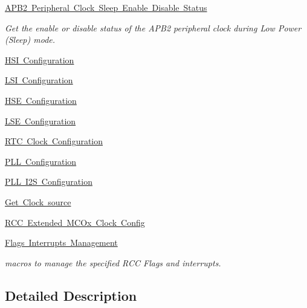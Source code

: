 \begin{DoxyCompactItemize}
\mbox{\hyperlink{group___r_c_c___a_p_b2___clock___sleep___enable___disable___status}{A\+P\+B2 Peripheral Clock Sleep Enable Disable Status}}
\begin{DoxyCompactList}\small\item\em Get the enable or disable status of the A\+P\+B2 peripheral clock during Low Power (Sleep) mode. \end{DoxyCompactList}\item 
\mbox{\hyperlink{group___r_c_c___h_s_i___configuration}{H\+S\+I Configuration}}
\item 
\mbox{\hyperlink{group___r_c_c___l_s_i___configuration}{L\+S\+I Configuration}}
\item 
\mbox{\hyperlink{group___r_c_c___h_s_e___configuration}{H\+S\+E Configuration}}
\item 
\mbox{\hyperlink{group___r_c_c___l_s_e___configuration}{L\+S\+E Configuration}}
\item 
\mbox{\hyperlink{group___r_c_c___internal___r_t_c___clock___configuration}{R\+T\+C Clock Configuration}}
\item 
\mbox{\hyperlink{group___r_c_c___p_l_l___configuration}{P\+L\+L Configuration}}
\item 
\mbox{\hyperlink{group___r_c_c___p_l_l___i2_s___configuration}{P\+L\+L I2\+S Configuration}}
\item 
\mbox{\hyperlink{group___r_c_c___get___clock__source}{Get Clock source}}
\item 
\mbox{\hyperlink{group___r_c_c_ex___m_c_ox___clock___config}{R\+C\+C Extended M\+C\+Ox Clock Config}}
\item 
\mbox{\hyperlink{group___r_c_c___flags___interrupts___management}{Flags Interrupts Management}}
\begin{DoxyCompactList}\small\item\em macros to manage the specified R\+CC Flags and interrupts. \end{DoxyCompactList}\end{DoxyCompactItemize}


\subsection{Detailed Description}
